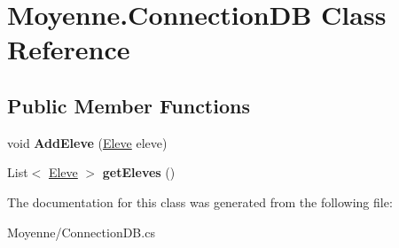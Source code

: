 \hypertarget{class_moyenne_1_1_connection_d_b}{}\section{Moyenne.\+Connection\+DB Class Reference}
\label{class_moyenne_1_1_connection_d_b}
\subsection*{Public Member Functions}
\begin{DoxyCompactItemize}
\item 
\mbox{\label{class_moyenne_1_1_connection_d_b_a22de5667092474c01745891870e1f0ec}} 
void {\bfseries Add\+Eleve} (\hyperlink{class_moyenne_1_1_eleve}{Eleve} eleve)
\item 
\mbox{\label{class_moyenne_1_1_connection_d_b_a6ef1b54a6f7a45e6c11b487032dea1fa}} 
List$<$ \hyperlink{class_moyenne_1_1_eleve}{Eleve} $>$ {\bfseries get\+Eleves} ()
\end{DoxyCompactItemize}


The documentation for this class was generated from the following file\+:\begin{DoxyCompactItemize}
\item 
Moyenne/Connection\+D\+B.\+cs\end{DoxyCompactItemize}
